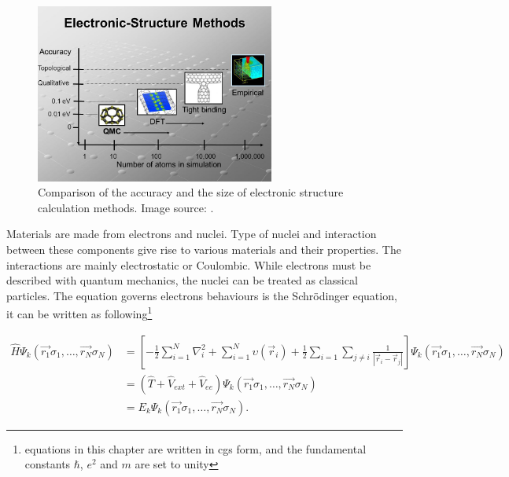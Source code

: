 \begin{figure}[htbp!] 
\centering  
\includegraphics[width=0.7\textwidth]{dft1.jpg}
\caption{ Comparison of the accuracy and the size of electronic structure calculation methods. Image source: \cite{dft_ac}.}  
\label{fig:dft_ac}
\end{figure} 

Materials are made from electrons and nuclei. Type of nuclei and interaction between these components give rise to various materials and their properties. The interactions are mainly electrostatic or Coulombic. While electrons must be described with quantum mechanics, the nuclei can be treated as classical particles. The equation governs electrons behaviours is the Schrödinger equation, it can be written as following\footnote{equations in this chapter are written in cgs form, and the fundamental constants $\hbar$, $e^2$ and $m$ are set to unity}

\begin{equation}
\begin{aligned}
\hat{H}\mathit{\Psi}_k(\vec{r_1}\sigma_1,\ldots,\vec{r_N}\sigma_N) &=\left[ -\frac{1}{2}\sum^N_{i=1}\nabla_i^2+\sum^N_{i=1}\upsilon(\vec{r}_i)+\frac{1}{2}\sum_{i=1}\sum_{j\neq i}\frac{1}{|\vec{r}_i-\vec{r}_j|}\right]\mathit{\Psi}_k(\vec{r_1}\sigma_1,\ldots,\vec{r_N}\sigma_N)  \\
&=\left( \hat{T} + \hat{V}_{ext} + \hat{V}_{ee}\right)\mathit{\Psi}_k(\vec{r_1}\sigma_1,\ldots,\vec{r_N}\sigma_N) \\
&=E_k\mathit{\Psi}_k(\vec{r_1}\sigma_1,\ldots,\vec{r_N}\sigma_N) .
\end{aligned}
\end{equation}

